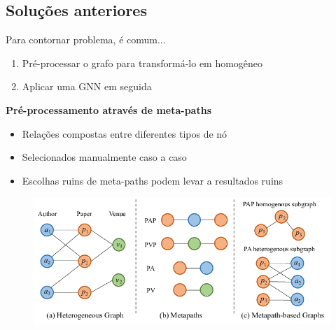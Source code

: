 \documentclass[12pt,notheorems,hyperref={pdfauthor=whatever}]{beamer}
\begin{document}

\subsection{Soluções anteriores}
\begin{frame}

Para contornar  problema, é comum...

\begin{enumerate}
    \item Pré-processar o grafo para transformá-lo em homogêneo
    \item Aplicar uma GNN em seguida
\end{enumerate}

    \vspace{10pt}

    \begin{description}
        \item[\textbf{Pré-processamento através de meta-paths}]
    \end{description}
    \begin{itemize}
        \item Relações compostas entre diferentes tipos de nó
        \item Selecionados manualmente caso a caso
        \item Escolhas ruins de meta-paths podem levar a resultados ruins
    \end{itemize}

    \vspace{10pt}
    
    
    
\end{frame}
\begin{frame}
    
\begin{figure}
    \centering
    \includegraphics[width=480pt]{img/image_metapath.png}
    \caption{\cite{cai_2021}}
    \label{fig:metapath}
\end{figure}

    
\end{frame}
\end{document}
